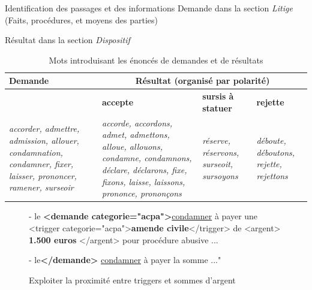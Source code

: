 \documentclass[newPxFont,pagenumber]{beamer}
\begin{document}
\begin{frame}{Identification des passages et des informations}
Demande dans la section \textit{Litige} (Faits, procédures, et moyens des parties)

Résultat dans la section \textit{Dispositif}
\scriptsize
\begin{table}
 \begin{tabular}{|p{}|p{}|p{}|p{}|}
 \hline
 \textbf{Demande} & \multicolumn{3}{c|}{\textbf{Résultat} (organisé par polarité)} \\ \hline
  & \textbf{accepte}  &\textbf{sursis à statuer} & \textbf{rejette}  \\ \hline
 \textit{accorder, admettre, admission, allouer, condamnation, condamner, fixer, laisser, prononcer, ramener, surseoir} & \textit{accorde, accordons, admet, admettons, alloue, allouons, condamne, condamnons, déclare, déclarons, fixe, fixons, laisse, laissons, prononce, prononçons} & \textit{réserve, réservons, surseoit, sursoyons} & \textit{déboute, déboutons, rejette, rejettons} \\ \hline
 \end{tabular}
  \caption{Mots introduisant les énoncés de demandes et de résultats}\label{introducing-words}
 \end{table}
 
 
 \begin{figure}
 \begin{flushleft}

- le \textbf{<demande categorie="acpa">}\underline{condamner} à payer une <trigger categorie="acpa">\textbf{amende civile}</trigger> de <argent> \textbf{1.500 euros} </argent> pour procédure abusive ...

- le\textbf{</demande>} \underline{condamner} à payer la somme ..."
\end{flushleft}
\caption{Exploiter la proximité entre triggers et sommes d'argent}\label{example-zone}
\end{figure} 
\end{frame}
\end{document}
